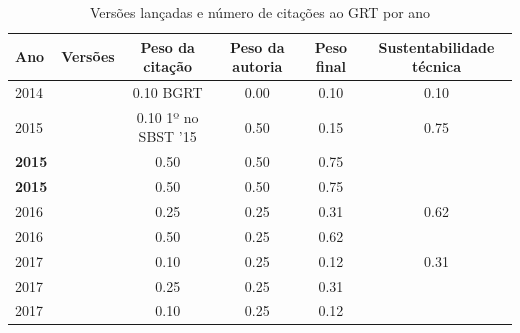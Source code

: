 \begin{table}[H]
\caption{Versões lançadas e número de citações ao GRT por ano}
\centering
\begin{tabular}{| l | c | c | c | c | c |}
  \hline
  Ano & Versões & Peso da citação & Peso da autoria & Peso final & Sustentabilidade técnica \\
  \hline
            2014
          &
          
          &
          0.10
            {\tiny BGRT}
          &
          0.00
          &
          0.10
          &
            {\color{red} 0.10}
          \\
\hline
            2015
          &
          
          &
          0.10
            {\tiny 1º no SBST '15}
          &
          0.50
          &
          0.15
          &
            {\color{blue} 0.75}
          \\
            {\bf 2015}
          &
          
          &
          0.50
          &
          0.50
          &
          0.75
          &
          \\
            {\bf 2015}
          &
          
          &
          0.50
          &
          0.50
          &
          0.75
          &
          \\
\hline
            2016
          &
          
          &
          0.25
          &
          0.25
          &
          0.31
          &
            {\color{blue} 0.62}
          \\
            2016
          &
          
          &
          0.50
          &
          0.25
          &
          0.62
          &
          \\
\hline
            2017
          &
          
          &
          0.10
          &
          0.25
          &
          0.12
          &
            {\color{red} 0.31}
          \\
            2017
          &
          
          &
          0.25
          &
          0.25
          &
          0.31
          &
          \\
            2017
          &
          
          &
          0.10
          &
          0.25
          &
          0.12
          &
          \\
\hline
\end{tabular}
\end{table}

